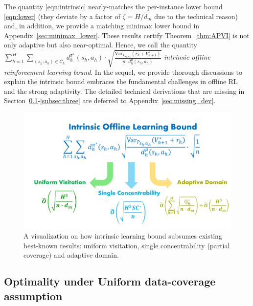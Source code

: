 The quantity \eqref{eqn:intrinsic} nearly-matches the per-instance lower bound \eqref{eqn:lower} (they deviate by a factor of $\zeta=H/\bar{d}_m$ due to the technical reason) and, in addition, we provide a matching minimax lower bound in Appendix~\ref{sec:minimax_lower}. These results certify Theorem~\ref{thm:APVI} is not only adaptive but also near-optimal. Hence, we call the quantity $\sum_{h=1}^H\sum_{(s_h,a_h)\in\mathcal{C}_h}d^{\pi^\star}_h(s_h,a_h)\cdot\sqrt{\frac{\mathrm{Var}_{P_{s_h,a_h}}(r_h+V^\star_{h+1})}{ n\cdot d^\mu_h{(s_h,a_h)}}}$ \emph{intrinsic offline reinforcement learning bound}. In the sequel, we provide thorough discussions to explain the intrinsic bound embraces the fundamental challenges in offline RL and the strong adaptivity. The detailed technical derivations that are missing in Section~\ref{subsec:one}-\ref{subsec:three} are deferred to Appendix~\ref{sec:missing_dev}.



\begin{figure}[H]
	\centering     %
	\includegraphics[width=115mm]{IOLB.pdf}
	\caption{A visualization on how intrinsic learning bound subsumes existing best-known results: uniform visitation, single concentrability (partial coverage) and adaptive domain.}
	\label{fig:main}
\end{figure}



\subsection{Optimality under Uniform data-coverage assumption}\label{subsec:one}

